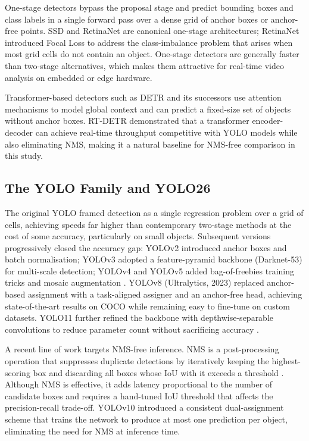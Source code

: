 One-stage detectors bypass the proposal stage and predict bounding boxes and class
labels in a single forward pass over a dense grid of anchor boxes or anchor-free
points.
SSD \cite{liu2016ssd} and RetinaNet \cite{lin2017focal} are canonical one-stage
architectures; RetinaNet introduced Focal Loss to address the class-imbalance problem
that arises when most grid cells do not contain an object.
One-stage detectors are generally faster than two-stage alternatives, which makes them
attractive for real-time video analysis on embedded or edge hardware.

Transformer-based detectors such as DETR \cite{carion2020end} and its successors use
attention mechanisms to model global context and can predict a fixed-size set of
objects without anchor boxes.
RT-DETR \cite{rtdetr2022} demonstrated that a transformer encoder-decoder can achieve
real-time throughput competitive with YOLO models while also eliminating NMS, making
it a natural baseline for NMS-free comparison in this study.

\subsection{The YOLO Family and YOLO26}

The original YOLO \cite{redmon2016you} framed detection as a single regression problem
over a grid of cells, achieving speeds far higher than contemporary two-stage methods
at the cost of some accuracy, particularly on small objects.
Subsequent versions progressively closed the accuracy gap: YOLOv2 introduced anchor
boxes and batch normalisation; YOLOv3 adopted a feature-pyramid backbone (Darknet-53)
for multi-scale detection; YOLOv4 and YOLOv5 added bag-of-freebies training tricks
and mosaic augmentation \cite{terven2023mlke}.
YOLOv8 (Ultralytics, 2023) replaced anchor-based assignment with a task-aligned
assigner and an anchor-free head, achieving state-of-the-art results on COCO while
remaining easy to fine-tune on custom datasets.
YOLO11 further refined the backbone with depthwise-separable convolutions to reduce
parameter count without sacrificing accuracy \cite{ultralytics_yolo11}.

A recent line of work targets NMS-free inference.
NMS is a post-processing operation that suppresses duplicate detections by iteratively
keeping the highest-scoring box and discarding all boxes whose IoU with it exceeds a
threshold \cite{wang2024yolov10}.
Although NMS is effective, it adds latency proportional to the number of candidate
boxes and requires a hand-tuned IoU threshold that affects the precision-recall
trade-off.
YOLOv10 \cite{wang2024yolov10} introduced a consistent dual-assignment scheme that trains
the network to produce at most one prediction per object, eliminating the need for NMS
at inference time.

